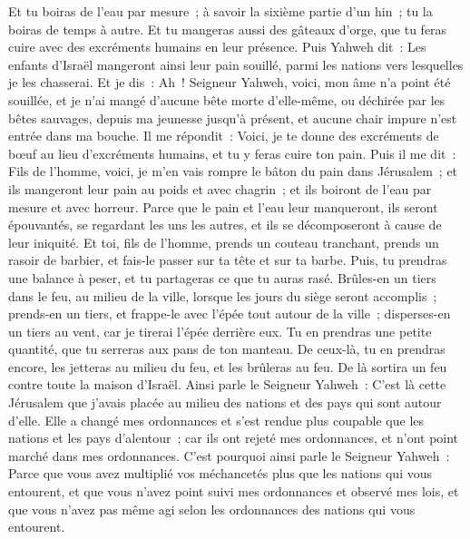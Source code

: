 \begin{multicols}{2}
Et tu boiras de l'eau par mesure~; à savoir la sixième partie d'un hin~; tu la boiras de temps à autre.
Et tu mangeras aussi des gâteaux d'orge, que tu feras cuire avec des excréments humains en leur présence.
Puis Yahweh dit~: Les enfants d'Israël mangeront ainsi leur pain souillé, parmi les nations vers lesquelles je les chasserai.
Et je dis~: Ah~! Seigneur Yahweh, voici, mon âme n'a point été souillée, et je n'ai mangé d'aucune bête morte d'elle-même, ou déchirée par les bêtes sauvages, depuis ma jeunesse jusqu'à présent, et aucune chair impure n'est entrée dans ma bouche.
Il me répondit~: Voici, je te donne des excréments de bœuf au lieu d'excréments humains, et tu y feras cuire ton pain.
Puis il me dit~: Fils de l'homme, voici, je m'en vais rompre le bâton du pain dans Jérusalem~; et ils mangeront leur pain au poids et avec chagrin~; et ils boiront de l'eau par mesure et avec horreur.
Parce que le pain et l'eau leur manqueront, ils seront épouvantés, se regardant les uns les autres, et ils se décomposeront à cause de leur iniquité.
\VerseOne{}Et toi, fils de l'homme, prends un couteau tranchant, prends un rasoir de barbier, et fais-le passer sur ta tête et sur ta barbe. Puis, tu prendras une balance à peser, et tu partageras ce que tu auras rasé.
Brûles-en un tiers dans le feu, au milieu de la ville, lorsque les jours du siège seront accomplis~; prends-en un tiers, et frappe-le avec l'épée tout autour de la ville~; disperses-en un tiers au vent, car je tirerai l'épée derrière eux.
Tu en prendras une petite quantité, que tu serreras aux pans de ton manteau.
De ceux-là, tu en prendras encore, les jetteras au milieu du feu, et les brûleras au feu. De là sortira un feu contre toute la maison d'Israël.
Ainsi parle le Seigneur Yahweh~: C'est là cette Jérusalem que j'avais placée au milieu des nations et des pays qui sont autour d'elle.
Elle a changé mes ordonnances et s'est rendue plus coupable que les nations et les pays d'alentour~; car ils ont rejeté mes ordonnances, et n'ont point marché dans mes ordonnances.
C'est pourquoi ainsi parle le Seigneur Yahweh~: Parce que vous avez multiplié vos méchancetés plus que les nations qui vous entourent, et que vous n'avez point suivi mes ordonnances et observé mes lois, et que vous n'avez pas même agi selon les ordonnances des nations qui vous entourent.

\end{multicols}
